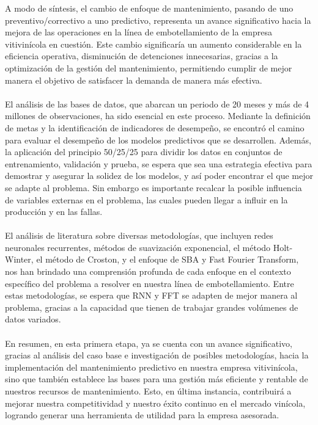 \documentclass[10pt]{article}
\begin{document}
A modo de síntesis, el cambio de enfoque de mantenimiento, pasando de uno preventivo/correctivo a uno predictivo, representa un avance significativo hacia la mejora de las operaciones en la línea de embotellamiento de la empresa vitivinícola en cuestión. Este cambio significaría un aumento considerable en la eficiencia operativa, disminución de detenciones innecesarias, gracias a la optimización de la gestión del mantenimiento, permitiendo cumplir de mejor manera el objetivo de satisfacer la demanda de manera más efectiva.\\
\\
El análisis de las bases de datos, que abarcan un periodo de 20 meses y más de 4 millones de observaciones, ha sido esencial en este proceso. Mediante la definición de metas y la identificación de indicadores de desempeño, se encontró el camino para evaluar el desempeño de los modelos predictivos que se desarrollen. Además, la aplicación del principio 50/25/25 para dividir los datos en conjuntos de entrenamiento, validación y prueba, se espera que sea una estrategia efectiva para demostrar y asegurar la solidez de los modelos, y así poder encontrar el que mejor se adapte al problema. Sin embargo es importante recalcar la posible influencia de variables externas en el problema, las cuales pueden llegar a influir en la producción y en las fallas.\\
\\
El análisis de literatura sobre diversas metodologías, que incluyen redes neuronales recurrentes, métodos de suavización exponencial, el método Holt-Winter, el método de Croston, y el enfoque de SBA y Fast Fourier Transform, nos han brindado una comprensión profunda de cada enfoque en el contexto específico del problema a resolver en nuestra línea de embotellamiento. Entre estas metodologías, se espera que RNN y FFT se adapten de mejor manera al problema, gracias a la capacidad que tienen de trabajar grandes volúmenes de datos variados. \\
\\
En resumen, en esta primera etapa, ya se cuenta con un avance significativo, gracias al análisis del caso base e investigación de posibles metodologías, hacia la implementación del mantenimiento predictivo en nuestra empresa vitivinícola, sino que también establece las bases para una gestión más eficiente y rentable de nuestros recursos de mantenimiento. Esto, en última instancia, contribuirá a mejorar nuestra competitividad y nuestro éxito continuo en el mercado vinícola, logrando generar una herramienta de utilidad para la empresa asesorada.
\end{document}
